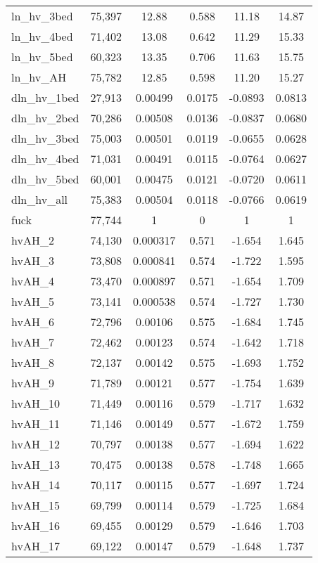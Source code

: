 \begin{tabular}{lccccc}
ln\_hv\_3bed & 75,397 & 12.88 & 0.588 & 11.18 & 14.87 \\
ln\_hv\_4bed & 71,402 & 13.08 & 0.642 & 11.29 & 15.33 \\
ln\_hv\_5bed & 60,323 & 13.35 & 0.706 & 11.63 & 15.75 \\
ln\_hv\_AH & 75,782 & 12.85 & 0.598 & 11.20 & 15.27 \\
dln\_hv\_1bed & 27,913 & 0.00499 & 0.0175 & -0.0893 & 0.0813 \\
dln\_hv\_2bed & 70,286 & 0.00508 & 0.0136 & -0.0837 & 0.0680 \\
dln\_hv\_3bed & 75,003 & 0.00501 & 0.0119 & -0.0655 & 0.0628 \\
dln\_hv\_4bed & 71,031 & 0.00491 & 0.0115 & -0.0764 & 0.0627 \\
dln\_hv\_5bed & 60,001 & 0.00475 & 0.0121 & -0.0720 & 0.0611 \\
dln\_hv\_all & 75,383 & 0.00504 & 0.0118 & -0.0766 & 0.0619 \\
fuck & 77,744 & 1 & 0 & 1 & 1 \\
hvAH\_2 & 74,130 & 0.000317 & 0.571 & -1.654 & 1.645 \\
hvAH\_3 & 73,808 & 0.000841 & 0.574 & -1.722 & 1.595 \\
hvAH\_4 & 73,470 & 0.000897 & 0.571 & -1.654 & 1.709 \\
hvAH\_5 & 73,141 & 0.000538 & 0.574 & -1.727 & 1.730 \\
hvAH\_6 & 72,796 & 0.00106 & 0.575 & -1.684 & 1.745 \\
hvAH\_7 & 72,462 & 0.00123 & 0.574 & -1.642 & 1.718 \\
hvAH\_8 & 72,137 & 0.00142 & 0.575 & -1.693 & 1.752 \\
hvAH\_9 & 71,789 & 0.00121 & 0.577 & -1.754 & 1.639 \\
hvAH\_10 & 71,449 & 0.00116 & 0.579 & -1.717 & 1.632 \\
hvAH\_11 & 71,146 & 0.00149 & 0.577 & -1.672 & 1.759 \\
hvAH\_12 & 70,797 & 0.00138 & 0.577 & -1.694 & 1.622 \\
hvAH\_13 & 70,475 & 0.00138 & 0.578 & -1.748 & 1.665 \\
hvAH\_14 & 70,117 & 0.00115 & 0.577 & -1.697 & 1.724 \\
hvAH\_15 & 69,799 & 0.00114 & 0.579 & -1.725 & 1.684 \\
hvAH\_16 & 69,455 & 0.00129 & 0.579 & -1.646 & 1.703 \\
hvAH\_17 & 69,122 & 0.00147 & 0.579 & -1.648 & 1.737 \\

\end{tabular}
